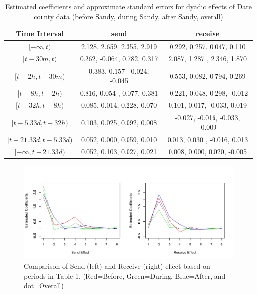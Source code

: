 \documentclass[a4paper]{article}
\begin{document}
\begin{table}[ht]
	\centering
	\begin{tabular}{ |c|cc| } 
		\hline 
		\textbf{Time Interval} &\textbf{send} & \textbf{receive} \\ 	
		\hline  $[-\infty, t)$&  2.128, 2.659, 2.355, 2.919& 0.292, 0.257, 0.047, 0.110\\  $[t-30 m, t)$ &  0.262, -0.064, 0.782, 0.317 &2.087, 1.287 , 2.346, 1.870\\  $[t-2h, t-30m)$& 0.383, 0.157 , 0.024, -0.045 &0.553, 0.082, 0.794, 0.269\\ $[t-8h, t-2h)$ & 0.816, 0.054 , 0.077, 0.381 &-0.221, 0.048, 0.298, -0.012 \\ $[t-32h, t-8h)$& 0.085, 0.014,  0.228, 0.070 &0.101, 0.017, -0.033, 0.019\\ $[t-5.33d, t-32h)$&  0.103, 0.025, 0.092, 0.008 &-0.027, -0.016, -0.033, -0.009 \\ $[t-21.33d, t-5.33d)$  & 0.052, 0.000, 0.059, 0.010& 0.013, 0.030 , -0.016, 0.013\\ 
		$[-\infty, t-21.33d)$  & 0.052, 0.103, 0.027, 0.021  & 0.008, 0.000, 0.020, -0.005\\
		\hline
	\end{tabular}
	\caption {Estimated coefficients and approximate standard errors for dyadic effects of Dare county data (before Sandy, during Sandy, after Sandy, overall)}
	\label{table:nullDare}
\end{table}
\footnotesize
\begin{figure}[ht]
	\centering
	\includegraphics[width=1.1\textwidth]{Dareplot.pdf} 
	\caption{Comparison of Send (left) and Receive (right) effect based on periods in Table 1. (Red=Before, Green=During, Blue=After, and dot=Overall)}	\label{fig:Emailplo22t}
\end{figure}
\end{document}
